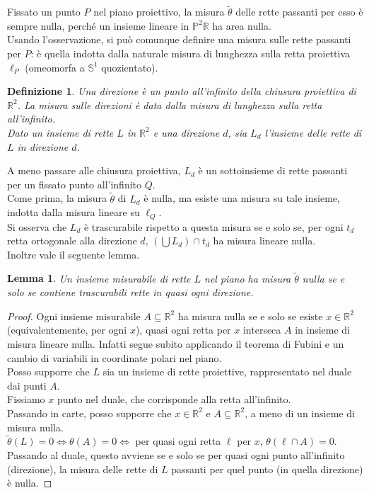 \documentclass[a4paper, twoside]{article}
\newcommand{\LRa}{\Leftrightarrow}
\newcommand{\R}{\mathbb{R}}
\renewcommand{\P}{\mathbb{P}}
\renewcommand{\S}{\mathbb{S}}
\newcommand{\<}{\langle}
\renewcommand{\>}{\rangle}
\newtheorem{lemma}[teo]{Lemma}
\newtheorem{defin}[teo]{Definizione}
\begin{document}
Fissato un punto $P$ nel piano proiettivo, la misura $\tilde \theta$ delle rette passanti per esso è sempre nulla, perché un insieme lineare in $\P^2 \R$ ha area nulla.\\
Usando l'osservazione, si può comunque definire una misura sulle rette passanti per $P$: è quella indotta dalla naturale misura di lunghezza sulla retta proiettiva $\ell_P$ (omeomorfa a $\S^1$ quozientato).

\begin{defin}
Una direzione è un punto all'infinito della chiusura proiettiva di $\R^2$. La misura sulle direzioni è data dalla misura di lunghezza sulla retta all'infinito.\\
Dato un insieme di rette $L$ in $\R^2$ e una direzione $d$, sia $L_{d}$ l'insieme delle rette di $L$ in direzione $d$.
\end{defin}

A meno passare alle chiusura proiettiva, $L_{d}$ è un sottoinsieme di rette passanti per un fissato punto all'infinito $Q$.\\
Come prima, la misura $\tilde \theta$ di $L_d$ è nulla, ma esiste una misura su tale insieme, indotta dalla misura lineare su $\ell_Q$.\\
Si osserva che $L_d$ è trascurabile rispetto a questa misura se e solo se, per ogni $t_d$ retta ortogonale alla direzione $d$, $ (\bigcup L_d) \cap t_d$ ha misura lineare nulla.\\
Inoltre vale il seguente lemma.

\begin{lemma}
	Un insieme misurabile di rette $L$ nel piano ha misura $\tilde \theta$ nulla se e solo se contiene trascurabili rette in quasi ogni direzione. 
\end{lemma}

\begin{proof}
	Ogni insieme misurabile $A \subseteq \R^2$ ha misura nulla se e solo se esiste $x \in \R^2$ (equivalentemente, per ogni $x$), quasi ogni retta per $x$ interseca $A$ in insieme di misura lineare nulla. Infatti segue subito applicando il teorema di Fubini e un cambio di variabili in coordinate polari nel piano.\\
	Posso supporre che $L$ sia un insieme di rette proiettive, rappresentato nel duale dai punti $A$.\\
	Fissiamo $x$ punto nel duale, che corrisponde alla retta all'infinito.\\
	Passando in carte, posso supporre che $x \in \R^2$ e $A\subseteq \R^2$, a meno di un insieme di misura nulla.\\
	$\tilde \theta (L)=0 \LRa \theta(A)=0 \LRa$ per quasi ogni retta $\ell$ per $x$, $\theta(\ell \cap A)=0$.\\
	Passando al duale, questo avviene se e solo se per quasi ogni punto all'infinito (direzione), la misura delle rette di $L$ passanti per quel punto (in quella direzione) è nulla.
\end{proof}	
\end{document}
